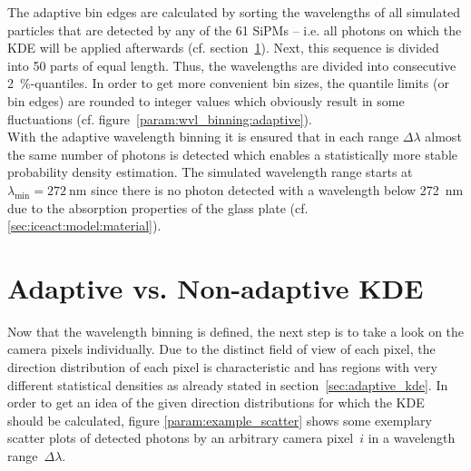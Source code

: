 The adaptive bin edges are calculated by sorting the wavelengths of all simulated particles that are detected by any of the 61 SiPMs -- i.e. all photons on which the KDE will be applied afterwards (cf. section~\ref{sec:adaptive_vs_nonadaptive}). Next, this sequence is divided into \num{50} parts of equal length. Thus, the wavelengths are divided into consecutive \SI{2}{\percent}-quantiles. In order to get more convenient bin sizes, the quantile limits (or bin edges) are rounded to integer values which obviously result in some fluctuations (cf. figure~\ref{param:wvl_binning:adaptive}).\\

With the adaptive wavelength binning it is ensured that in each range $\Delta\lambda$ almost the same number of photons is detected which enables a statistically more stable probability density estimation. The simulated wavelength range starts at $\lambda_\text{min}=\SI{272}{\nano\meter}$ since there is no photon detected with a wavelength below \SI{272}{\nano\meter} due to the absorption properties of the glass plate (cf. \ref{sec:iceact:model:material}).

\section{Adaptive vs. Non-adaptive KDE}\label{sec:adaptive_vs_nonadaptive}

Now that the wavelength binning is defined, the next step is to take a look on the camera pixels individually. Due to the distinct field of view of each pixel, the direction distribution of each pixel is characteristic and has regions with very different statistical densities as already stated in section~\ref{sec:adaptive_kde}. In order to get an idea of the given direction distributions for which the KDE should be calculated, figure \ref{param:example_scatter} shows some exemplary scatter plots of detected photons by an arbitrary camera pixel~$i$ in a wavelength range~$\Delta\lambda$.\\

